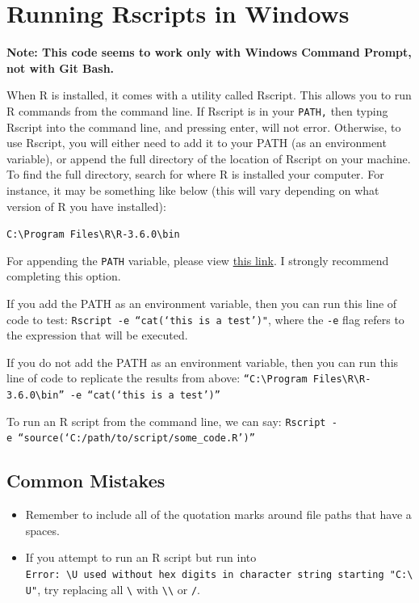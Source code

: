 \documentclass[]{book}
\providecommand{\tightlist}{%
  \setlength{\itemsep}{0pt}\setlength{\parskip}{0pt}}
\begin{document}
\section{Running Rscripts in Windows}\label{running-rscripts-in-windows}

\textbf{Note: This code seems to work only with Windows Command Prompt,
not with Git Bash.}

When R is installed, it comes with a utility called Rscript. This allows
you to run R commands from the command line. If Rscript is in your
\texttt{PATH,} then typing Rscript into the command line, and pressing
enter, will not error. Otherwise, to use Rscript, you will either need
to add it to your PATH (as an environment variable), or append the full
directory of the location of Rscript on your machine. To find the full
directory, search for where R is installed your computer. For instance,
it may be something like below (this will vary depending on what version
of R you have installed):

\texttt{C:\textbackslash{}Program\ Files\textbackslash{}R\textbackslash{}R-3.6.0\textbackslash{}bin}

For appending the \texttt{PATH} variable, please view
\href{https://www.howtogeek.com/118594/how-to-edit-your-system-path-for-easy-command-line-access/}{this
link}. I strongly recommend completing this option.

If you add the PATH as an environment variable, then you can run this
line of code to test: \texttt{Rscript\ -e\ “cat(‘this\ is\ a\ test’)"},
where the \texttt{-e} flag refers to the expression that will be
executed.

If you do not add the PATH as an environment variable, then you can run
this line of code to replicate the results from above:
\texttt{“C:\textbackslash{}Program\ Files\textbackslash{}R\textbackslash{}R-3.6.0\textbackslash{}bin”\ -e\ “cat(‘this\ is\ a\ test’)”}

To run an R script from the command line, we can say:
\texttt{Rscript\ -e\ “source(‘C:/path/to/script/some\_code.R’)”}

\subsection{Common Mistakes}\label{common-mistakes}

\begin{itemize}
\tightlist
\item
  Remember to include all of the quotation marks around file paths that
  have a spaces.
\item
  If you attempt to run an R script but run into
  \texttt{Error:\ \textquotesingle{}\textbackslash{}U\textquotesingle{}\ used\ without\ hex\ digits\ in\ character\ string\ starting\ "\textquotesingle{}C:\textbackslash{}U"},
  try replacing all \texttt{\textbackslash{}} with
  \texttt{\textbackslash{}\textbackslash{}} or \texttt{/}.
\end{itemize}
\end{document}
